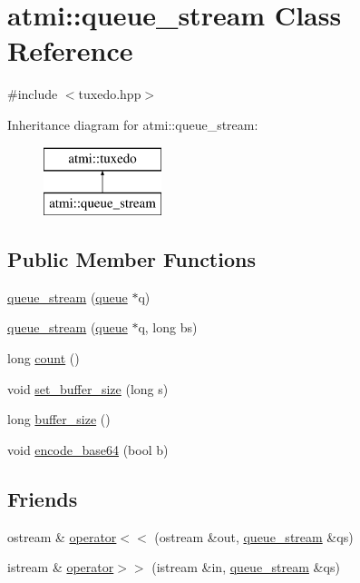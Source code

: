 \hypertarget{classatmi_1_1queue__stream}{\section{atmi\+:\+:queue\+\_\+stream Class Reference}
\label{classatmi_1_1queue__stream}
}


{\ttfamily \#include $<$tuxedo.\+hpp$>$}

Inheritance diagram for atmi\+:\+:queue\+\_\+stream\+:\begin{figure}[H]
\begin{center}
\leavevmode
\includegraphics[height=2.000000cm]{classatmi_1_1queue__stream}
\end{center}
\end{figure}
\subsection*{Public Member Functions}
\begin{DoxyCompactItemize}
\item 
\hyperlink{classatmi_1_1queue__stream_a775623d6cd91a8a3cd40d9bb1e492c60}{queue\+\_\+stream} (\hyperlink{classatmi_1_1queue}{queue} $\ast$q)
\item 
\hyperlink{classatmi_1_1queue__stream_af05f48449db9ed2282643d9e7c148944}{queue\+\_\+stream} (\hyperlink{classatmi_1_1queue}{queue} $\ast$q, long bs)
\item 
long \hyperlink{classatmi_1_1queue__stream_ac4f1e88530a4d9fda0bc4b271301866b}{count} ()
\item 
void \hyperlink{classatmi_1_1queue__stream_a500b658e3f3f1a353982a1304ea27801}{set\+\_\+buffer\+\_\+size} (long s)
\item 
long \hyperlink{classatmi_1_1queue__stream_a18d01411c5ffeffd190195fd2b4dc61a}{buffer\+\_\+size} ()
\item 
void \hyperlink{classatmi_1_1queue__stream_a4a47e7caf329e46c31f44425e3ceb6e3}{encode\+\_\+base64} (bool b)
\end{DoxyCompactItemize}
\subsection*{Friends}
\begin{DoxyCompactItemize}
\item 
ostream \& \hyperlink{classatmi_1_1queue__stream_ad655c66351739698af3d404de31d3179}{operator$<$$<$} (ostream \&out, \hyperlink{classatmi_1_1queue__stream}{queue\+\_\+stream} \&qs)
\item 
istream \& \hyperlink{classatmi_1_1queue__stream_a52e264f6a625c0a453157abc46da7efe}{operator$>$$>$} (istream \&in, \hyperlink{classatmi_1_1queue__stream}{queue\+\_\+stream} \&qs)
\end{DoxyCompactItemize}
